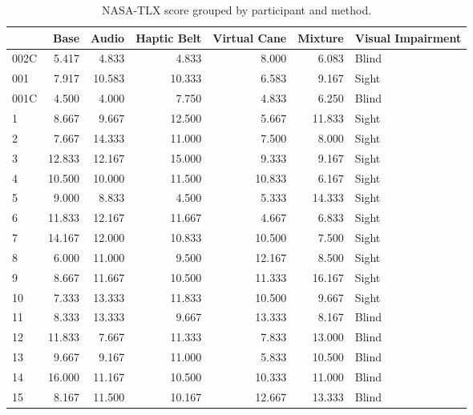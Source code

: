 
\begin{table}[!htb]
\centering
\caption{NASA-TLX score grouped by participant and method.}
\label{tab:nasa_average}
\begin{tabular}{lrrrrrl}
\toprule
{} &   Base &  Audio &  Haptic Belt &  Virtual Cane &  Mixture & Visual Impairment \\
\midrule
002C &  5.417 &  4.833 &        4.833 &         8.000 &    6.083 &             Blind \\
001  &  7.917 & 10.583 &       10.333 &         6.583 &    9.167 &             Sight \\
001C &  4.500 &  4.000 &        7.750 &         4.833 &    6.250 &             Blind \\
1    &  8.667 &  9.667 &       12.500 &         5.667 &   11.833 &             Sight \\
2    &  7.667 & 14.333 &       11.000 &         7.500 &    8.000 &             Sight \\
3    & 12.833 & 12.167 &       15.000 &         9.333 &    9.167 &             Sight \\
4    & 10.500 & 10.000 &       11.500 &        10.833 &    6.167 &             Sight \\
5    &  9.000 &  8.833 &        4.500 &         5.333 &   14.333 &             Sight \\
6    & 11.833 & 12.167 &       11.667 &         4.667 &    6.833 &             Sight \\
7    & 14.167 & 12.000 &       10.833 &        10.500 &    7.500 &             Sight \\
8    &  6.000 & 11.000 &        9.500 &        12.167 &    8.500 &             Sight \\
9    &  8.667 & 11.667 &       10.500 &        11.333 &   16.167 &             Sight \\
10   &  7.333 & 13.333 &       11.833 &        10.500 &    9.667 &             Sight \\
11   &  8.333 & 13.333 &        9.667 &        13.333 &    8.167 &             Blind \\
12   & 11.833 &  7.667 &       11.333 &         7.833 &   13.000 &             Blind \\
13   &  9.667 &  9.167 &       11.000 &         5.833 &   10.500 &             Blind \\
14   & 16.000 & 11.167 &       10.500 &        10.333 &   11.000 &             Blind \\
15   &  8.167 & 11.500 &       10.167 &        12.667 &   13.333 &             Blind \\

\end{tabular}
\end{table}

